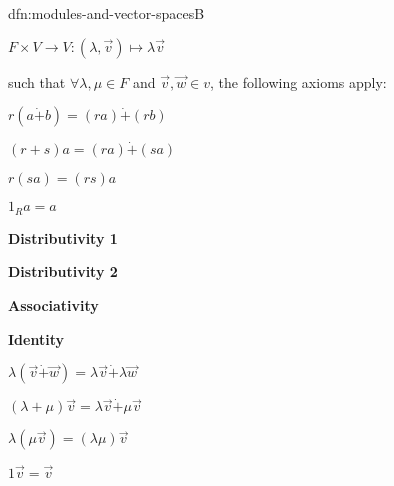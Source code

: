 \documentclass[landscape, 8pt]{extarticle}
\begin{document}
\begin{multicols}{3}
\begin{dfn}{dfn:modules-and-vector-spaces}{B}
\begin{multicols}{2}
        \columnbreak
        \begin{center}
            $F \times V \to V : (\lambda, \vec{v})\mapsto \lambda \vec{v}$
        \end{center}

        \vspace{-5pt}
        such that $\forall \lambda, \mu\in F$ and $\vec{v},\vec{w}\in v$, the following axioms apply:
    \end{multicols}

    \vspace{-25pt}
    \setlength{\columnseprule}{0pt}
    \begin{multicols}{3}
        \begin{flushright}
            $r(a \dot{+} b) = (ra) \dot{+} (rb)$

            $(r + s)a = (ra) \dot{+} (sa)$

            $r (sa) = (rs) a$

            $1_{R}a = a$
        \end{flushright}


        \columnbreak
        \begin{center}
            \textbf{Distributivity 1}

            \textbf{Distributivity 2}

            \textbf{Associativity}

            \textbf{Identity}
        \end{center}

        \columnbreak

            $\lambda(\vec{v} \dot{+} \vec{w}) = \lambda\vec{v} \dot{+} \lambda \vec{w}$

            $(\lambda + \mu)\vec{v} = \lambda \vec{v} \dot{+} \mu \vec{v}$

            $\lambda (\mu \vec{v}) = (\lambda \mu) \vec{v}$

            $1\vec{v} = \vec{v}$
    \end{multicols}


\end{dfn}
\end{multicols}
\end{document}
